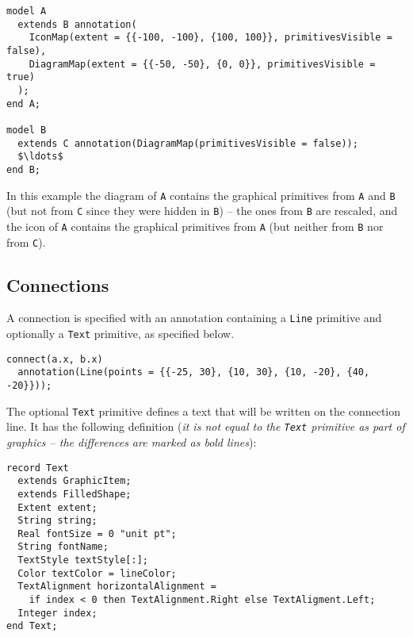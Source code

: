 \begin{example}
\begin{lstlisting}[language=modelica]
model A
  extends B annotation(
    IconMap(extent = {{-100, -100}, {100, 100}}, primitivesVisible = false),
    DiagramMap(extent = {{-50, -50}, {0, 0}}, primitivesVisible = true)
  );
end A;

model B
  extends C annotation(DiagramMap(primitivesVisible = false));
  $\ldots$
end B;
\end{lstlisting}
In this example the diagram of \lstinline!A! contains the graphical primitives
from \lstinline!A! and \lstinline!B! (but not from \lstinline!C! since they were hidden in \lstinline!B!) -- the ones
from \lstinline!B! are rescaled, and the icon of \lstinline!A! contains the graphical primitives
from \lstinline!A! (but neither from \lstinline!B! nor from \lstinline!C!).
\end{example}

\subsection{Connections}\label{connections1}

A connection is specified with an annotation containing a \lstinline!Line! primitive and optionally a \lstinline!Text! primitive, as specified below.

\begin{example}
\begin{lstlisting}[language=modelica]
connect(a.x, b.x)
  annotation(Line(points = {{-25, 30}, {10, 30}, {10, -20}, {40, -20}}));
\end{lstlisting}
\end{example}

The optional \lstinline!Text! primitive defines a text that will be written on the connection line.
It has the following definition (\emph{it is not equal to the \lstinline!Text! primitive as part of graphics -- the differences are marked as bold lines}):
\begin{lstlisting}[language=modelica]
record Text
  extends GraphicItem;
  extends FilledShape;
  Extent extent;
  String string;
  Real fontSize = 0 "unit pt";
  String fontName;
  TextStyle textStyle[:];
  Color textColor = lineColor;
  TextAlignment horizontalAlignment =
    if index < 0 then TextAlignment.Right else TextAligment.Left;
  Integer index;
end Text;
\end{lstlisting}

